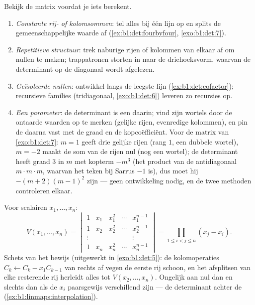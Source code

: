\begin{method}
\label{met:b1:det:strategy}
Bekijk de matrix voordat je iets berekent.
\begin{enumerate}
  \item \emph{Constante rij- of kolomsommen}: tel alles bij één
        lijn op en splits de gemeenschappelijke waarde af
        (\cref{ex:b1:det:fourbyfour}, \cref{exo:b1:det:7}).
  \item \emph{Repetitieve structuur}: trek naburige rijen of
        kolommen van elkaar af om nullen te maken; trappatronen
        storten in naar de driehoeksvorm, waarvan de determinant op
        de diagonaal wordt afgelezen.
  \item \emph{Geïsoleerde nullen}: ontwikkel langs de leegste lijn
        (\cref{ex:b1:det:cofactor}); recursieve families
        (tridiagonaal, \cref{exo:b1:det:6}) leveren zo recursies op.
  \item \emph{Een parameter}: de determinant is een  daarin;
        vind zijn wortels door de ontaarde waarden op te merken
        (gelijke rijen, evenredige kolommen), en pin de 
        daarna vast met de graad en de kopcoëfficiënt. Voor de
        matrix van \cref{exo:b1:det:7}: $m = 1$ geeft drie gelijke
        rijen (rang $1$, een dubbele wortel), $m = -2$ maakt de som
        van de rijen nul (nog een wortel); de determinant heeft
        graad $3$ in $m$ met kopterm $-m^3$ (het product van de
        antidiagonaal $m\cdot m\cdot m$, waarvan het teken bij
        Sarrus $-1$ is), dus moet hij $-(m+2)(m-1)^2$ zijn --- geen
        ontwikkeling nodig, en de twee methoden controleren elkaar.
\end{enumerate}
\end{method}

\begin{example}\label{ex:b1:det:vandermonde}
Voor scalairen $x_1, \dots, x_n$:
\[
V(x_1, \dots, x_n) =
\begin{vmatrix}
1 & x_1 & x_1^2 & \cdots & x_1^{n-1}\\
1 & x_2 & x_2^2 & \cdots & x_2^{n-1}\\
\vdots & & & & \vdots\\
1 & x_n & x_n^2 & \cdots & x_n^{n-1}
\end{vmatrix}
= \prod_{1 \leq i < j \leq n} (x_j - x_i) .
\]
Schets van het bewijs (uitgewerkt in \cref{exo:b1:det:5}): de
kolomoperaties $C_k \leftarrow C_k - x_1 C_{k-1}$ van rechts af
vegen de eerste rij schoon, en het afsplitsen van elke resterende
rij herleidt alles tot $V(x_2, \dots, x_n)$. Ongelijk aan nul dan
en slechts dan als de $x_i$ paarsgewijs verschillend zijn --- de
determinant achter de 
(\cref{ex:b1:linmaps:interpolation}).
\end{example}

